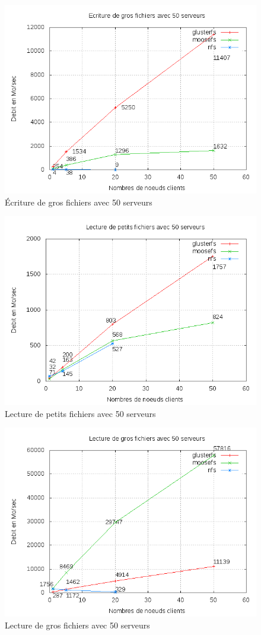 \documentclass[blue]{beamer}
\begin{document}
		\begin{frame}
			\begin{figure}
				\includegraphics[width=0.75\linewidth]{../images/srv50wb2.png}
				\caption{Écriture de gros fichiers avec 50 serveurs}
			\end{figure}
		\end{frame}

		\begin{frame}
			\begin{figure}
				\includegraphics[width=0.75\linewidth]{../images/srv50rs2.png}
				\caption{Lecture de petits fichiers avec 50 serveurs}
			\end{figure}
		\end{frame}

		\begin{frame}
			\begin{figure}
				\includegraphics[width=0.75\linewidth]{../images/srv50rb2.png}
				\caption{Lecture de gros fichiers avec 50 serveurs}
			\end{figure}
		\end{frame}
\end{document}
